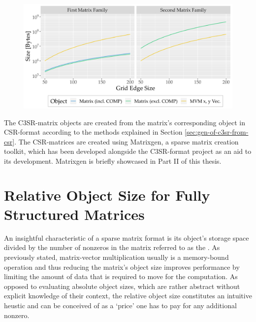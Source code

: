     \begin{figure}[H]
        \centering
        \captionsetup{width=0.9\columnwidth}
        \includegraphics[width=0.9\columnwidth]{assets/test-matrices-object-size.png} %
        \label{fig:test-matrices-object-size}
    \end{figure}

    The C3SR-matrix objects are created from the matrix's corresponding object in CSR-format according to the methods
    explained in Section \ref{sec:gen-of-c3sr-from-csr}. The CSR-matrices are created using Matrixgen, a sparse matrix
    creation toolkit, which has been developed alongside the C3SR-format project as an aid to its development. Matrixgen
    is briefly showcased in Part II of this thesis.

  \section{Relative Object Size for Fully Structured Matrices} \label{sec:rel-object-size-fully-structured}

    An insightful characteristic of a sparse matrix format is its object's storage space divided by the number of
    nonzeros in the matrix referred to as the . As previously stated, matrix-vector
    multiplication usually is a memory-bound operation and thus reducing the matrix's object size improves performance
    by limiting the amount of data that is required to move for the computation. As opposed to evaluating absolute
    object sizes, which are rather abstract without explicit knowledge of their context, the relative object size
    constitutes an intuitive heustic and can be conceived of as a `price' one has to pay for any additional nonzero.

